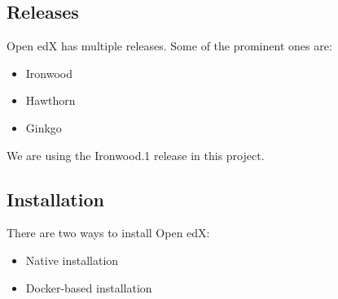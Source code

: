 \documentclass[12pt]{article}
\begin{document}
\subsection{Releases}
Open edX has multiple releases. Some of the prominent ones are:
\begin{itemize}
	\item Ironwood
	\item Hawthorn
	\item Ginkgo
\end{itemize}
We are using the Ironwood.1 release in this project.

\subsection{Installation}
There are two ways to install Open edX:
\begin{itemize}
	\item Native installation
	\item Docker-based installation
\end{itemize}
\end{document}
